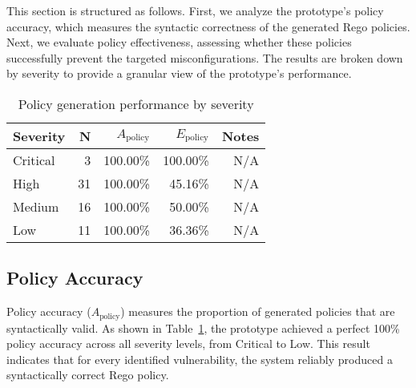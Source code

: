 This section is structured as follows. First, we analyze the prototype's policy accuracy, which measures the syntactic correctness of the generated Rego policies. Next, we evaluate policy effectiveness, assessing whether these policies successfully prevent the targeted misconfigurations. The results are broken down by severity to provide a granular view of the prototype's performance.

\begin{table}[htbp]
	\centering
		\caption{Policy generation performance by severity}\label{tab:effectiveness-by-severity}
	\begin{tabular}{lrrrr}
		\hline
		Severity & N & $A_{\text{policy}}$ & $E_{\text{policy}}$ & Notes \\
		\hline
		Critical & 3 & 100.00\% & 100.00\% & N/A \\
		High & 31 & 100.00\% & 45.16\% & N/A \\
		Medium & 16 & 100.00\% & 50.00\% & N/A \\
		Low & 11 & 100.00\% & 36.36\% & N/A \\
		\hline
	\end{tabular}
\end{table}

\subsection{Policy Accuracy}
Policy accuracy ($A_{\text{policy}}$) measures the proportion of generated policies that are syntactically valid. As shown in Table~\ref{tab:effectiveness-by-severity}, the prototype achieved a perfect 100\% policy accuracy across all severity levels, from Critical to Low. This result indicates that for every identified vulnerability, the system reliably produced a syntactically correct Rego policy.

